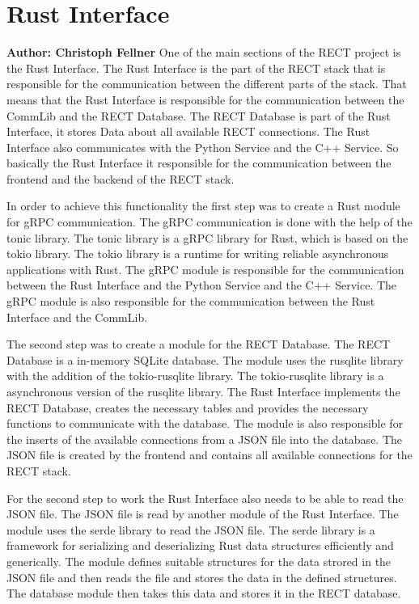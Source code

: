 \section{Rust Interface}
\textbf{Author: Christoph Fellner}
One of the main sections of the RECT project is the Rust Interface. The Rust Interface is the part of the RECT stack that is responsible for the communication between 
the different parts of the stack. That means that the Rust Interface is responsible for the communication between the CommLib and the RECT Database. The RECT Database is 
part of the Rust Interface, it stores Data about all available RECT connections. The Rust Interface also communicates with the Python Service and the C++ Service. So 
basically the Rust Interface it responsible for the communication between the frontend and the backend of the RECT stack.\newline

In order to achieve this functionality the first step was to create a Rust module for gRPC communication. The gRPC communication is done with the help of the tonic library.
The tonic library is a gRPC library for Rust, which is based on the tokio library. The tokio library is a runtime for writing reliable asynchronous applications with Rust.
The gRPC module is responsible for the communication between the Rust Interface and the Python Service and the C++ Service. The gRPC module is also responsible for the 
communication between the Rust Interface and the CommLib.\newline 

The second step was to create a module for the RECT Database. The RECT Database is a in-memory SQLite database. The module uses the rusqlite library with the addition of
the tokio-rusqlite library. The tokio-rusqlite library is a asynchronous version of the rusqlite library. The Rust Interface implements the RECT Database, creates the 
necessary tables and provides the necessary functions to communicate with the database. The module is also responsible for the inserts of the available connections from a
JSON file into the database. The JSON file is created by the frontend and contains all available connections for the RECT stack.\newline

For the second step to work the Rust Interface also needs to be able to read the JSON file. The JSON file is read by another module of the Rust Interface. The module uses
the serde library to read the JSON file. The serde library is a framework for serializing and deserializing Rust data structures efficiently and generically. The module 
defines suitable structures for the data strored in the JSON file and then reads the file and stores the data in the defined structures. The database module then takes
this data and stores it in the RECT database.\newline

